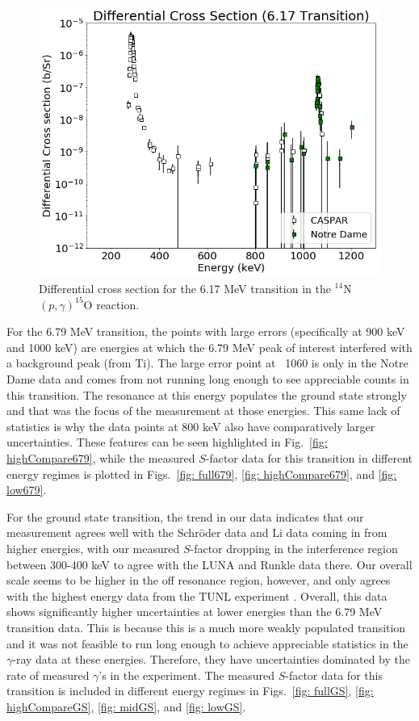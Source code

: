 \begin{figure}
		\includegraphics[width=1.0\linewidth]{figures/cs617.png}
	\caption{Differential cross section for the 6.17 MeV transition in the $^{14}$N$\left( p,\gamma \right) ^{15}$O reaction. }
	\label{fig: cs617}
\end{figure}


For the 6.79 MeV transition, the points with large errors (specifically at 900 keV and 1000 keV) are energies at which the 6.79 MeV peak of interest interfered with a background peak (from Ti). The large error point at ~1060 is only in the Notre Dame data and comes from not running long enough to see appreciable counts in this transition. The resonance at this energy populates the ground state strongly and that was the focus of the measurement at those energies. This same lack of statistics is why the data points at 800 keV also have comparatively larger uncertainties. These features can be seen highlighted in Fig.\ \ref{fig: highCompare679}, while the measured $S$-factor data for this transition in different energy regimes is plotted in Figs.\ \ref{fig: full679}, \ref{fig: highCompare679}, and \ref{fig: low679}.

For the ground state transition, the trend in our data indicates that our
measurement agrees well with the Schr{\"o}der data \cite{Schroder1987} and Li data \cite{Li2016} coming in from higher energies, with our measured $S$-factor dropping in the interference region between 300-400 keV to agree with the LUNA \cite{Imbriani2005} and Runkle \cite{Runkle2005} data there. Our overall scale seems to be higher in the off resonance region, however, and only agrees with the highest energy data from the TUNL experiment \cite{Runkle2005}. Overall, this data shows significantly higher uncertainties at lower energies than the 6.79 MeV transition data. This is because this is a much more weakly populated transition and it was not feasible to run long enough to achieve appreciable statistics in the $\gamma$-ray data at these energies. Therefore, they have uncertainties dominated by the rate of measured $\gamma$'s in the experiment. The measured $S$-factor data for this transition is included in different energy regimes in Figs.\ \ref{fig: fullGS}, \ref{fig: highCompareGS}, \ref{fig: midGS}, and \ref{fig: lowGS}.


